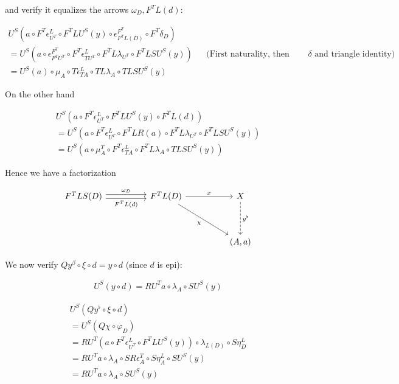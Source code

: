 \documentclass[10pt, oneside]{article}
\begin{document}
\noindent and verify it equalizes the arrows $\omega_D, F^T L (d)$:

\begin{align*}
    U^S \left( a \circ F^T \epsilon^L_{U^T} \circ F^T L U^S (y) \circ \epsilon^{F^T}_{F^T L (D)} \circ F^T \delta_{D} \right)
    \\ = U^S \left( a \circ \epsilon^{F^T}_{F^T U^T} \circ F^T \epsilon^L_{T U^T} \circ F^T L \lambda_{U^T} \circ F^T L S U^S (y) \right) && \text{(First naturality, then expand $\delta$ and triangle identity)}
    \\ = U^S (a) \circ \mu_A \circ T \epsilon^L_{TA} \circ T L \lambda_A \circ T L S U^S (y)
\end{align*}

On the other hand

\begin{align*}
    U^S \left( a \circ F^T \epsilon^L_{U^T} \circ F^T L U^S (y) \circ F^T L (d) \right)
    \\ = U^S \left( a \circ F^T \epsilon^L_{U^T} \circ F^T L R (a) \circ F^T L \lambda_{U^T} \circ F^T L S U^S (y) \right)
    \\ = U^S \left( a \circ \mu^T_A \circ F^T \epsilon^L_{TA} \circ F^T L \lambda_A \circ T L S U^S (y) \right)
\end{align*}
    
Hence we have a factorization

\[\begin{tikzcd}[ampersand replacement=\&]
	{F^T L S (D)} \&\& {F^T L (D)} \&\& X \\
	\\
	\&\&\&\& {(A, a)}
	\arrow["{\omega_D}", shift left, from=1-1, to=1-3]
	\arrow["{F^T L(d)}"', shift right, from=1-1, to=1-3]
	\arrow["x", from=1-3, to=1-5]
	\arrow["\chi"', from=1-3, to=3-5]
	\arrow["{y^\flat}", dashed, from=1-5, to=3-5]
\end{tikzcd}\]

We now verify $Q y^\beta \circ \xi \circ d = y \circ d$ (since $d$ is epi):

\begin{align*}
    U^S \left( y \circ d \right) = R U^T a \circ \lambda_A \circ S U^S (y)
\end{align*}

\begin{align*}
    U^S \left( Q y^\flat \circ \xi \circ d \right)
    \\ = U^S \left( Q \chi \circ \varphi_D \right)
    \\ = R U^T ( a \circ F^T \epsilon^L_{U^T} \circ F^T L U^S (y) ) \circ \lambda_{L(D)} \circ S \eta^L_{D}
    \\ = R U^T a \circ \lambda_A \circ S R \epsilon^T_A \circ S \eta^L_{A} \circ S U^S (y)
    \\ = R U^T a \circ \lambda_A \circ S U^S (y)
\end{align*}
\end{document}
